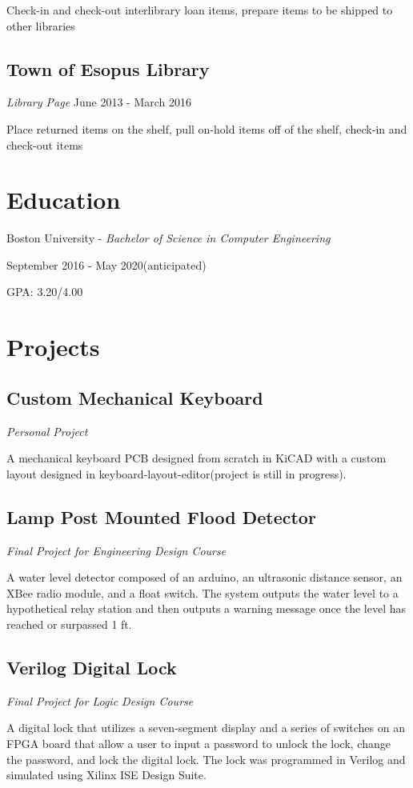 \documentclass{article}
\begin{document}
Check-in and check-out interlibrary loan items, prepare items to be shipped to other libraries
\subsection{Town of Esopus Library} \textit{Library Page}
June 2013 - March 2016

Place returned items on the shelf, pull on-hold items off of the shelf, check-in and check-out items

\section{Education}
Boston University - \textit{Bachelor of Science in Computer Engineering}

September 2016 - May 2020(anticipated)

GPA: 3.20/4.00

\section{Projects}
\subsection{Custom Mechanical Keyboard} \textit{Personal Project}

A mechanical keyboard PCB designed from scratch in KiCAD with a custom layout designed in keyboard-layout-editor(project is still in progress).
\subsection{Lamp Post Mounted Flood Detector} \textit{Final Project for Engineering Design Course}

A water level detector composed of an arduino, an ultrasonic distance sensor, an XBee radio module, and a float switch. The system outputs the water level to a hypothetical relay station and then outputs a warning message once the level has reached or surpassed 1 ft.
\subsection{Verilog Digital Lock} \textit{Final Project for Logic Design Course}

A digital lock that utilizes a seven-segment display and a series of switches on an FPGA board that allow a user to input a password to unlock the lock, change the password, and lock the digital lock. The lock was programmed in Verilog and simulated using Xilinx ISE Design Suite.
\end{document}
